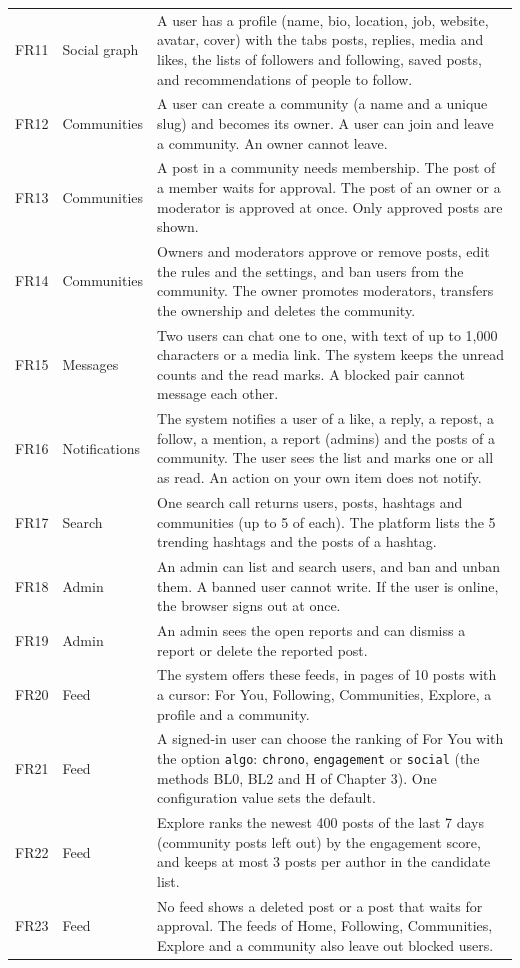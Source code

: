 {\begin{longtable}{@{}>{\raggedright\arraybackslash}p{1.1cm} >{\raggedright\arraybackslash}p{2.5cm} >{\raggedright\arraybackslash}p{\dimexpr\textwidth-3.6cm-4\tabcolsep\relax}@{}}
  FR11 & Social graph & A user has a profile (name, bio, location, job, website, avatar, cover) with the tabs posts, replies, media and likes, the lists of followers and following, saved posts, and recommendations of people to follow. \\
  FR12 & Communities & A user can create a community (a name and a unique slug) and becomes its owner. A user can join and leave a community. An owner cannot leave. \\
  FR13 & Communities & A post in a community needs membership. The post of a member waits for approval. The post of an owner or a moderator is approved at once. Only approved posts are shown. \\
  FR14 & Communities & Owners and moderators approve or remove posts, edit the rules and the settings, and ban users from the community. The owner promotes moderators, transfers the ownership and deletes the community. \\
  FR15 & Messages & Two users can chat one to one, with text of up to 1,000 characters or a media link. The system keeps the unread counts and the read marks. A blocked pair cannot message each other. \\
  FR16 & Notifications & The system notifies a user of a like, a reply, a repost, a follow, a mention, a report (admins) and the posts of a community. The user sees the list and marks one or all as read. An action on your own item does not notify. \\
  FR17 & Search & One search call returns users, posts, hashtags and communities (up to 5 of each). The platform lists the 5 trending hashtags and the posts of a hashtag. \\
  FR18 & Admin & An admin can list and search users, and ban and unban them. A banned user cannot write. If the user is online, the browser signs out at once. \\
  FR19 & Admin & An admin sees the open reports and can dismiss a report or delete the reported post. \\
  FR20 & Feed & The system offers these feeds, in pages of 10 posts with a cursor: For You, Following, Communities, Explore, a profile and a community. \\
  FR21 & Feed & A signed-in user can choose the ranking of For You with the option \texttt{algo}: \texttt{chrono}, \texttt{engagement} or \texttt{social} (the methods BL0, BL2 and H of Chapter 3). One configuration value sets the default. \\
  FR22 & Feed & Explore ranks the newest 400 posts of the last 7 days (community posts left out) by the engagement score, and keeps at most 3 posts per author in the candidate list. \\
  FR23 & Feed & No feed shows a deleted post or a post that waits for approval. The feeds of Home, Following, Communities, Explore and a community also leave out blocked users. \\
\end{longtable}}


